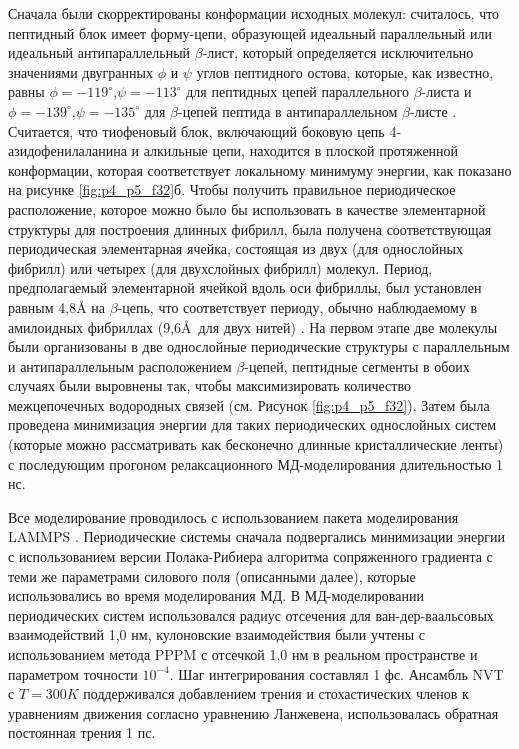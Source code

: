     Сначала были скорректированы конформации исходных молекул: считалось, что пептидный блок имеет форму-цепи, образующей идеальный параллельный или идеальный антипараллельный $\beta$-лист, который определяется исключительно значениями двугранных $\phi$ и $\psi$ углов пептидного остова, которые, как известно, равны $\phi= -119^{\circ}$,$\psi= -113^{\circ}$ для пептидных цепей параллельного $\beta$-листа и $\phi= -139^{\circ}$,$\psi= -135^{\circ}$ для $\beta$-цепей пептида в антипараллельном $\beta$-листе \cite{nelson_lehninger_2000}. Считается, что тиофеновый блок, включающий боковую цепь 4-азидофенилаланина и алкильные цепи, находится в плоской протяженной конформации, которая соответствует локальному минимуму энергии, как показано на рисунке \ref{fig:p4_p5_f32}б. Чтобы получить правильное периодическое расположение, которое можно было бы использовать в качестве элементарной структуры для построения длинных фибрилл, была получена соответствующая периодическая элементарная ячейка, состоящая из двух (для однослойных фибрилл) или четырех (для двухслойных фибрилл) молекул. Период, предполагаемый элементарной ячейкой вдоль оси фибриллы, был установлен равным 4,8\AA{} на $\beta$-цепь, что соответствует периоду, обычно наблюдаемому в амилоидных фибриллах (9,6\AA\  для двух нитей) \cite{balbach_supramolecular_2002}. На первом этапе две молекулы были организованы в две однослойные периодические структуры с параллельным и антипараллельным расположением $\beta$-цепей, пептидные сегменты в обоих случаях были выровнены так, чтобы максимизировать количество межцепочечных водородных связей (см. Рисунок \ref{fig:p4_p5_f32}). Затем была проведена минимизация энергии для таких периодических однослойных систем (которые можно рассматривать как бесконечно длинные кристаллические ленты) с последующим прогоном релаксационного МД-моделирования длительностью 1 нс.

    Все моделирование проводилось с использованием пакета моделирования LAMMPS \cite{plimpton_fast_1995}. Периодические системы сначала подвергались минимизации энергии с использованием версии Полака-Рибиера алгоритма сопряженного градиента с теми же параметрами силового поля (описанными далее), которые использовались во время моделирования МД. В МД-моделировании периодических систем использовался радиус отсечения для ван-дер-ваальсовых взаимодействий 1,0 нм, кулоновские взаимодействия были учтены с использованием метода PPPM \cite{hockney_computer_1989} с отсечкой 1,0 нм в реальном пространстве и параметром точности $10^{-4}$. Шаг интегрирования составлял 1 фс. Ансамбль NVT с $T=300 K$ поддерживался добавлением трения и стохастических членов к уравнениям движения согласно уравнению Ланжевена, использовалась обратная постоянная трения 1 пс.

